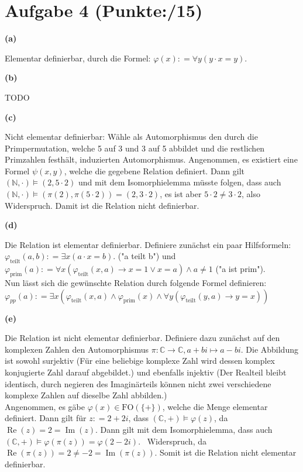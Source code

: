 \documentclass[11pt, a4paper]{article}
\newcommand{\ppp}{15}
\newcommand{\defgr}{\mathrel{\mathop:\!\!=}}
\begin{document}
\section*{Aufgabe 4 (Punkte:\qquad/\ppp)}
\textbf{(a)}
\begin{adjustwidth}{20pt}{20pt}
	Elementar definierbar, durch die Formel: $\varphi(x) \defgr \forall y(y \cdot x = y)$.
\end{adjustwidth}
\textbf{(b)}
\begin{adjustwidth}{20pt}{20pt}
TODO
\end{adjustwidth}
\textbf{(c)}
\begin{adjustwidth}{20pt}{20pt}
	Nicht elementar definierbar: Wähle als Automorphismus den durch die Primpermutation, welche 5 auf 3 und 3 auf 5 abbildet und die restlichen Primzahlen festhält, induzierten Automorphismus.
	Angenommen, es existiert eine Formel $\psi(x,y)$, welche die gegebene Relation definiert. Dann gilt $(\mathbb{N},\cdot) \models (2,5\cdot 2)$ und mit dem Isomorphielemma müsste folgen, dass
	auch $(\mathbb{N},\cdot) \models (\pi(2),\pi(5\cdot 2))=(2,3 \cdot 2)$, es ist aber $5\cdot 2 \neq 3 \cdot 2$, also Widerspruch. Damit ist die Relation nicht definierbar.
\end{adjustwidth}
\textbf{(d)}
\begin{adjustwidth}{20pt}{20pt}
	Die Relation ist elementar definierbar. Definiere zunächst ein paar Hilfsformeln:\\
	$\varphi_{\text{teilt}}(a,b) \defgr \exists x(a \cdot x = b)$. ("a teilt b") und\\
	$\varphi_{\text{prim}}(a) \defgr \forall x(\varphi_{\text{teilt}}(x,a) \rightarrow x=1 \vee x=a) \wedge a\neq 1$ ("a ist prim").\\
	Nun lässt sich die gewünschte Relation durch folgende Formel definieren:\\
	$\varphi_{pp}(a) \defgr \exists x(\varphi_{\text{teilt}}(x,a) \wedge \varphi_{\text{prim}}(x) \wedge \forall y(\varphi_{\text{teilt}}(y,a) \rightarrow y=x))$
\end{adjustwidth}
\textbf{(e)}
\begin{adjustwidth}{20pt}{20pt}
	Die Relation ist nicht elementar definierbar. Definiere dazu zunächst auf den komplexen Zahlen den Automorphismus $\pi:\mathbb{C} \to \mathbb{C}, a+bi \mapsto a-bi$. Die Abbildung
	ist sowohl surjektiv (Für eine beliebige komplexe Zahl wird dessen komplex konjugierte Zahl darauf abgebildet.) und ebenfalls injektiv (Der Realteil bleibt identisch, durch negieren des
	Imaginärteils können nicht zwei verschiedene komplexe Zahlen auf dieselbe Zahl abbilden.)\\
	Angenommen, es gäbe $\varphi(x) \in \text{FO}(\{ +\})$, welche die Menge elementar definiert. Dann gilt für $z \defgr 2+2i$, dass $(\mathbb{C},+) \models \varphi(z)$, da
	$\operatorname{Re}(z)=2=\operatorname{Im}(z)$. Dann gilt mit dem Isomorphielemma, dass auch $(\mathbb{C},+) \models \varphi(\pi(z))=\varphi(2-2i)$. \Lightning\ Widerspruch, da
	$\operatorname{Re}(\pi(z))=2\neq -2=\operatorname{Im}(\pi(z))$. Somit ist die Relation nicht elementar definierbar.
\end{adjustwidth}
\end{document}
